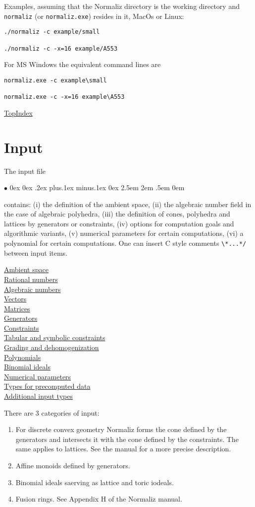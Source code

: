 \documentclass[12pt,a4paper]{scrartcl}
\makeatletter
\newcommand{\stdli}{ \topsep0ex \partopsep0ex %
\parsep.2ex plus.1ex minus.1ex \itemsep0ex%
\leftmargin2.5em \labelwidth2em \labelsep.5em \rightmargin0em}%
\renewenvironment{itemize}{\begin{list}{{$\bullet$}}{\stdli}}{\end{list}}
\theoremstyle{definition}
\def\OurIndex#1{\index{#1@\texttt{#1}}}
\def\itemtt[#1]{\OurIndex{#1}\item[\textbf{\ttt{#1}}]}
\def\ttt{\texttt}
\def\ContLine#1{\hyperref[#1]{\large #1}\\[6pt]}
\def\SectStart#1{\section{#1}\label{#1}\def\SectHead{#1}}
\def\TopIndex{\bigskip\bigskip\par \hspace{120pt}\hyperref[Top]{\large Top}\hspace{120pt}\hyperref[Index]{\large Index}\newpage}
\makeatother
\begin{document}
Examples, assuming that the Normaliz directory is the working directory and \verb|normaliz| (or \verb|normaliz.exe|) resides in it, MacOs or Linux:
\begin{Verbatim}
./normaliz -c example/small

./normaliz -c -x=16 example/A553
\end{Verbatim}
For MS Windows the equivalent command lines are
\begin{Verbatim}
normaliz.exe -c example\small

normaliz.exe -c -x=16 example\A553
\end{Verbatim}

\TopIndex

\SectStart{Input}

The input file 
\begin{itemize}
	\itemtt[<project>.in] 
\end{itemize}
contains: (i) the definition of the ambient space, (ii) the algebraic number field in the case of algebraic polyhedra, (iii) the definition of cones, polyhedra and lattices by generators or constraints, (iv) options for computation goals and algorithmic variants, (v)  numerical parameters for certain computations, (vi) a polynomial for certain computations. One can insert C style comments \verb|\*...*/| between input items.\bigskip

\ContLine{Ambient space}
\ContLine{Rational numbers}
\ContLine{Algebraic numbers}
\ContLine{Vectors}
\ContLine{Matrices}
\ContLine{Generators}
\ContLine{Constraints}
\ContLine{Tabular and symbolic constraints}
\ContLine{Grading and dehomogenization}
\ContLine{Polynomials}
\ContLine{Binomial ideals}
\ContLine{Numerical parameters}
\ContLine{Types for precomputed data}
\ContLine{Additional input types}
\medskip

There are 3 categories of input:
\begin{enumerate}
	\item For discrete convex geometry Normaliz forms the cone defined by the generators and intersects it with the cone defined by the constraints. The same applies to lattices. See the manual for a more precise description. 
	
	\item Affine monoids defined by generators.
	
	\item Binomial ideals saerving as lattice and toric iodeals. 
	
	\item Fusion rings. See Appendix H of the Normaliz manual.
\end{enumerate}
\end{document}

